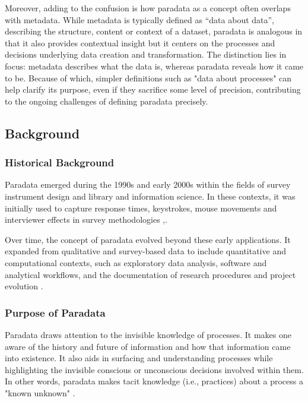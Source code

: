 Moreover, adding to the confusion is how paradata as a concept often overlaps with metadata. 
While metadata is typically defined as “data about data”, describing the structure, content or context of a dataset, paradata is analogous in that it also provides contextual insight but it centers on the processes and decisions underlying data creation and transformation.
The distinction lies in focus: metadata describes what the data is, whereas paradata reveals how it came to be.  
Because of which, simpler definitions such as "data about processes" can help clarify its purpose, even if they sacrifice some level of precision, contributing to the ongoing challenges of defining paradata precisely.

\subsection{Background}

\subsubsection{Historical Background}

Paradata emerged during the 1990s and early 2000s within the fields of survey instrument design and library and information science. 
In these contexts, it was initially used to capture response times, keystrokes, mouse movements and interviewer effects in survey methodologies \cite{oconnor_secondary_2017},\cite{schenk_paradata_2024}.

Over time, the concept of paradata evolved beyond these early applications. It expanded from qualitative and survey-based data to include quantitative and computational contexts, such as exploratory data analysis, software and analytical workflows, and the documentation of research procedures and project evolution \cite{huvila_perspectives_2024}.

\subsubsection{Purpose of Paradata}

Paradata draws attention to the invisible knowledge of processes. \cite{prusak_where_2001} It makes one aware of the history and future of information and how that information came into existence. It also aids in surfacing and understanding processes while highlighting the invisible conscious or unconscious decisions involved within them. In other words, paradata makes tacit knowledge (i.e., practices) about a process a "known unknown" \cite{huggett_capturing_2020}.

